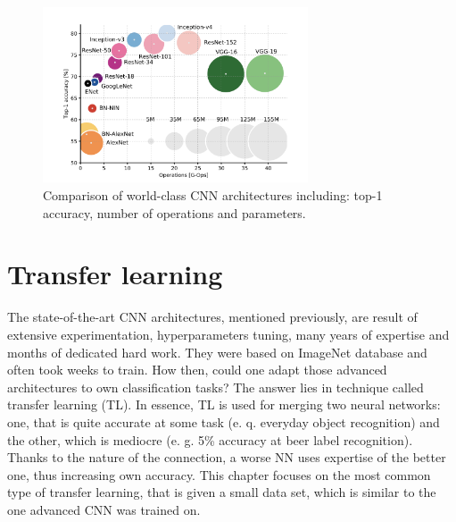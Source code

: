 \documentclass[11pt, a4paper]{article}
\begin{document}
\begin{figure}[h]
\includegraphics[width=0.7\textwidth]{world_cnns}
\centering
\caption[Porównanie najlepszych konwolucyjnych sieci neuronowych]{Comparison of world-class CNN architectures \cite{canziani_analysis} including: top-1 accuracy, number of operations and parameters.}
\label{fig:world_cnns}
\end{figure}
\clearpage

\section{Transfer learning} \label{transfer_learning}
The state-of-the-art CNN architectures, mentioned previously, are result of extensive experimentation, hyperparameters tuning, many years of expertise and months of dedicated hard work. They were based on ImageNet database and often took weeks to train. How then, could one adapt those advanced architectures to own classification tasks? The answer lies in technique called transfer learning (TL). In essence, TL is used for merging two neural networks: one, that is quite accurate at some task (e. q. everyday object recognition) and the other, which is mediocre (e. g. 5\% accuracy at beer label recognition). Thanks to the nature of the connection, a worse NN uses expertise of the better one, thus increasing own accuracy. This chapter focuses on the most common type of transfer learning, that is given a small data set, which is similar to the one advanced CNN was trained on.\\
\end{document}
